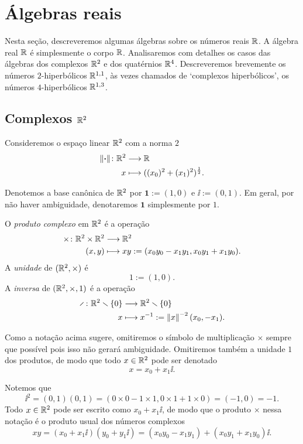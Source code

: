 \section{Álgebras reais}

Nesta seção, descreveremos algumas álgebras sobre os números reais $\mathbb{R}$. A álgebra real $\mathbb{R}$ é simplesmente o corpo $\mathbb{R}$. Analisaremos com detalhes os casos das álgebras dos complexos $\mathbb{R}^2$ e dos quatérnios $\mathbb{R}^4$. Descreveremos brevemente os números $2$-hiperbólicos $\mathbb{R}^{1,1}$, às vezes chamados de `complexos hiperbólicos', os números $4$-hiperbólicos $\mathbb{R}^{1,3}$.

\subsection{Complexos $\mathbb{R}^2$}

Consideremos o espaço linear $\mathbb{R}^2$ com a norma $2$
	\begin{align*}
	{\left\Vert{\bm{\cdot}}\right\Vert}\colon {\mathbb{R}^2} &\longrightarrow {\mathbb{R}} \\{x} &\longmapsto ((x_0)^2 + (x_1)^2)^{\frac{1}{2}}.
	\end{align*}

Denotemos a base canônica de $\mathbb{R}^2$ por $\bm 1 := (1,0)$ e $\ii := (0,1)$. Em geral, por não haver ambiguidade, denotaremos $\bm 1$ simplesmente por $1$.

\begin{definition}
O \emph{produto complexo} em $\mathbb{R}^2$ é a operação
	\begin{align*}
	{\times}\colon {\mathbb{R}^2 \times \mathbb{R}^2} &\longrightarrow {\mathbb{R}^2} \\{(x,y)} &\longmapsto xy := (x_0y_0-x_1y_1,x_0y_1+x_1y_0).
	\end{align*}
A \emph{unidade} de $(\mathbb{R}^2,\times)$ é
	\begin{equation*}
	1 := (1,0).
	\end{equation*}
A \emph{inversa} de $(\mathbb{R}^2,\times,1)$ é a operação
	\begin{align*}
	\func{\div}{\R^2 \setminus \{0\}}{\R^2 \setminus \{0\}}{x}{x\inv := \nor{x}^{-2}(x_0,-x_1)}.
	\end{align*}
\end{definition}

Como a notação acima sugere, omitiremos o símbolo de multiplicação $\times$ sempre que possível pois isso não gerará ambiguidade. Omitiremos também a unidade $1$ dos produtos, de modo que todo $x \in \mathbb{R}^2$ pode ser denotado
	\begin{equation*}
	x = x_0 + x_1\ii.
	\end{equation*}

Notemos que
	\begin{equation*}
	\ii^2 = (0,1)(0,1) = (0 \times 0 - 1 \times 1, 0 \times 1 + 1 \times 0) = (-1,0) = -1.
	\end{equation*}
Todo $x \in \mathbb{R}^2$ pode ser escrito como $x_0 + x_1 \ii$, de modo que o produto $\times$ nessa notação é o produto usual dos números complexos
	\begin{equation*}
	xy = (x_0 + x_1 \ii)(y_0 + y_1 \ii) = (x_0y_0-x_1y_1) + (x_0y_1+x_1y_0) \ii.
	\end{equation*}

